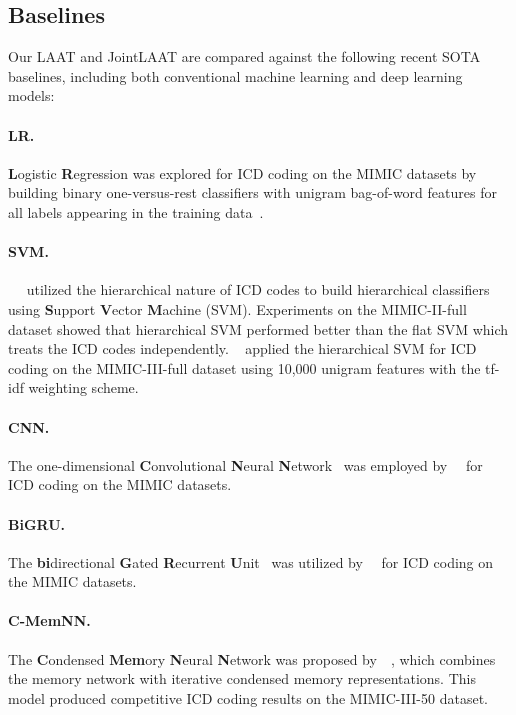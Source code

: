 \documentclass{article}
\begin{document}
\subsection{Baselines} \label{ssec:bl}
Our LAAT and JointLAAT are compared against the following recent SOTA baselines, including both conventional machine learning and deep learning models:
\paragraph{LR.} \textbf{L}ogistic \textbf{R}egression was explored for ICD coding on the MIMIC datasets by building binary one-versus-rest classifiers with unigram bag-of-word features for all labels appearing in the training data~\cite{mullenbach2018}.   

\paragraph{SVM.}~\citeauthor{perotte2013diagnosis}~ utilized the hierarchical nature of ICD codes to build hierarchical classifiers using \textbf{S}upport \textbf{V}ector \textbf{M}achine (SVM). Experiments on the MIMIC-II-full dataset showed that hierarchical SVM performed better than the flat SVM which treats the ICD codes independently. \citeauthor{xie2019ehr}~ applied the hierarchical SVM for ICD coding on the MIMIC-III-full dataset using 10,000 unigram features with the tf-idf weighting scheme.

\paragraph{CNN.} The one-dimensional \textbf{C}onvolutional \textbf{N}eural \textbf{N}etwork~\cite{kim2014convolutional} was employed by~\citeauthor{mullenbach2018}~ for ICD coding on the MIMIC datasets.

\paragraph{BiGRU.} The \textbf{bi}directional \textbf{G}ated \textbf{R}ecurrent \textbf{U}nit~\cite{Kyunghyun2014} was utilized by~\citeauthor{mullenbach2018}~ for ICD coding on the MIMIC datasets.

\paragraph{C-MemNN.} The \textbf{C}ondensed \textbf{Mem}ory \textbf{N}eural \textbf{N}etwork was proposed by~\citeauthor{prakash2017condensed}~, which combines the memory network \cite{NIPS2015_5846} with iterative condensed memory representations. This model produced competitive ICD coding  results on the MIMIC-III-50 dataset.
\end{document}
